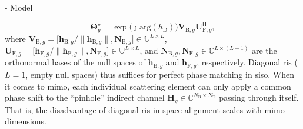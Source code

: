 \documentclass[journal]{IEEEtran}
\begin{document}
\begin{section}{- Model}
\begin{itemize}
		\begin{equation}
			\mathbf{\Theta}_g^\star = \exp \bigl(\jmath \mathrm{arg}(h_\mathrm{D})\bigr) \mathbf{V}_{\mathrm{B},g} \mathbf{U}_{\mathrm{F},g}^\mathsf{H},
			\label{eq:scattering_siso}
		\end{equation}
		where $\mathbf{V}_{\mathrm{B},g} = \bigl[\mathbf{h}_{\mathrm{B},g}/\lVert \mathbf{h}_{\mathrm{B},g} \rVert, \mathbf{N}_{\mathrm{B},g}\bigr] \in \mathbb{U}^{L \times L}$, $\mathbf{U}_{\mathrm{F},g} = \bigl[\mathbf{h}_{\mathrm{F},g}/\lVert \mathbf{h}_{\mathrm{F},g} \rVert, \mathbf{N}_{\mathrm{F},g}\bigr] \in \mathbb{U}^{L \times L}$, and $\mathbf{N}_{\mathrm{B},g}, \mathbf{N}_{\mathrm{F},g} \in \mathbb{C}^{L \times (L-1)}$ are the orthonormal bases of the null spaces of $\mathbf{h}_{\mathrm{B},g}$ and $\mathbf{h}_{\mathrm{F},g}$, respectively.
		Diagonal \gls{ris} ($L=1$, empty null spaces) thus suffices for perfect phase matching in \gls{siso}.
		When it comes to \gls{mimo}, each individual scattering element can only apply a common phase shift to the ``pinhole'' indirect channel $\mathbf{H}_g \in \mathbb{C}^{N_\mathrm{R} \times N_\mathrm{T}}$ passing through itself.
		That is, the disadvantage of diagonal \gls{ris} in space alignment scales with \gls{mimo} dimensions.
	\end{itemize}







\end{section}
\end{document}
